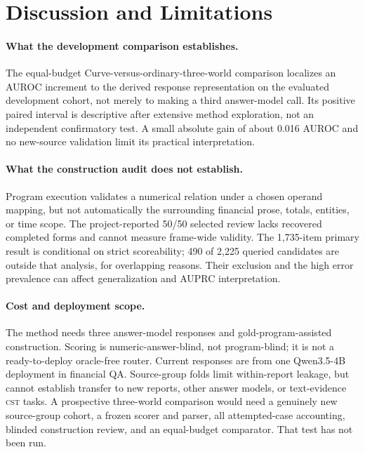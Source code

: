 \documentclass[11pt]{article}
\newcommand{\CST}{\textsc{cst}}
\begin{document}
\section{Discussion and Limitations}
\paragraph{What the development comparison establishes.}
The equal-budget Curve-versus-ordinary-three-world comparison localizes an AUROC increment to the derived response representation on the evaluated development cohort, not merely to making a third answer-model call. Its positive paired interval is descriptive after extensive method exploration, not an independent confirmatory test. A small absolute gain of about 0.016 AUROC and no new-source validation limit its practical interpretation.

\paragraph{What the construction audit does not establish.}
Program execution validates a numerical relation under a chosen operand mapping, but not automatically the surrounding financial prose, totals, entities, or time scope. The project-reported 50/50 selected review lacks recovered completed forms and cannot measure frame-wide validity. The 1,735-item primary result is conditional on strict scoreability; 490 of 2,225 queried candidates are outside that analysis, for overlapping reasons. Their exclusion and the high error prevalence can affect generalization and AUPRC interpretation.

\paragraph{Cost and deployment scope.}
The method needs three answer-model responses and gold-program-assisted construction. Scoring is numeric-answer-blind, not program-blind; it is not a ready-to-deploy oracle-free router. Current responses are from one Qwen3.5-4B deployment in financial QA. Source-group folds limit within-report leakage, but cannot establish transfer to new reports, other answer models, or text-evidence \CST{} tasks. A prospective three-world comparison would need a genuinely new source-group cohort, a frozen scorer and parser, all attempted-case accounting, blinded construction review, and an equal-budget comparator. That test has not been run.
\end{document}
